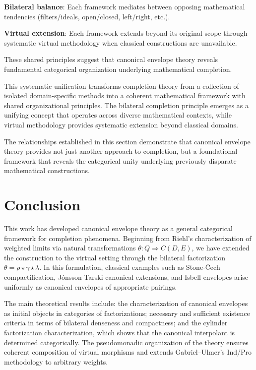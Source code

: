 \documentclass[11pt]{article}
\theoremstyle{plain}
\theoremstyle{definition}
\theoremstyle{remark}
\begin{document}
\textbf{Bilateral balance}: Each framework mediates between opposing mathematical tendencies (filters/ideals, open/closed, left/right, etc.).

\textbf{Virtual extension}: Each framework extends beyond its original scope through systematic virtual methodology when classical constructions are unavailable.

These shared principles suggest that canonical envelope theory reveals fundamental categorical organization underlying mathematical completion.

This systematic unification transforms completion theory from a collection of isolated domain-specific methods into a coherent mathematical framework with shared organizational principles. The bilateral completion principle emerges as a unifying concept that operates across diverse mathematical contexts, while virtual methodology provides systematic extension beyond classical domains.

The relationships established in this section demonstrate that canonical envelope theory provides not just another approach to completion, but a foundational framework that reveals the categorical unity underlying previously disparate mathematical constructions.

\section{Conclusion}

This work has developed canonical envelope theory as a general categorical framework for completion phenomena.  
Beginning from Riehl's characterization of weighted limits via natural transformations $\theta : Q \Rightarrow C(D,E)$, we have extended the construction to the virtual setting through the bilateral factorization $\theta = \rho \star \gamma \star \lambda$.  
In this formulation, classical examples such as Stone-\v{C}ech compactification, J\'{o}nsson-Tarski canonical extensions, and Isbell envelopes arise uniformly as canonical envelopes of appropriate pairings.

The main theoretical results include: the characterization of canonical envelopes as initial objects in categories of factorizations; necessary and sufficient existence criteria in terms of bilateral denseness and compactness; and the cylinder factorization  characterization, which shows that the canonical interpolant is determined categorically.  The pseudomonadic organization of the theory ensures coherent composition of virtual morphisms and extends Gabriel--Ulmer's Ind/Pro methodology to arbitrary weights.
\end{document}

